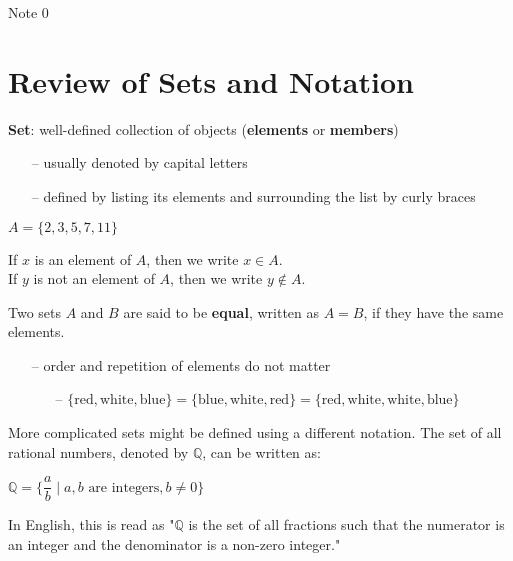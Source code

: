 \documentclass[12pt,a4paper]{article}
\author{Henry Yu}
\begin{document}
\raggedright

\begin{center}
	\huge{Note 0}
\end{center}

\section*{Review of Sets and Notation}

\textbf{Set}: well-defined collection of objects (\textbf{elements} or \textbf{members})

\begin{itemize}
	\item[--] usually denoted by capital letters
	\item[--] defined by listing its elements and surrounding the list by curly braces
\end{itemize}

\begin{center}
	$A=\{2, 3, 5, 7, 11\}$
\end{center}

If $x$ is an element of $A$, then we write $x \in A$. \\
If $y$ is not an element of $A$, then we write $y \notin A$. \\

\bigbreak

Two sets $A$ and $B$ are said to be \textbf{equal}, written as $A=B$, if they have the same elements.
\begin{itemize}
	\item[--] order and repetition of elements do not matter
	\begin{itemize}
		\item[--] $\{\text{red}, \text{white}, \text{blue}\}=\{\text{blue},\text{white},\text{red}\}=\{\text{red},\text{white},\text{white},\text{blue}\}$
	\end{itemize}
\end{itemize}

More complicated sets might be defined using a different notation. The set of all rational numbers, denoted by $\mathbb{Q}$, can be written as:
\begin{center}
	$\mathbb{Q}=\{\dfrac{a}{b}\mid a, b\text{ are integers}, b\neq0\}$
\end{center}

In English, this is read as "$\mathbb{Q}$ is the set of all fractions such that the numerator is an integer and the denominator is a non-zero integer."
\end{document}
